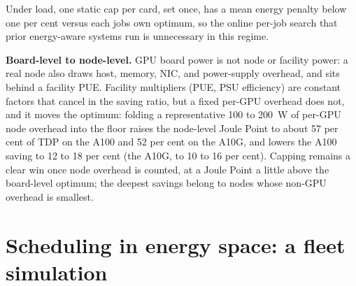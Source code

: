 Under load, one static cap per card, set once, has a mean energy penalty below one per cent versus each job\textquotesingle s own optimum, so the online per-job search that prior energy-aware systems run is unnecessary in this regime.

\textbf{Board-level to node-level.} GPU board power is not node or facility power: a real node also draws host, memory, NIC, and power-supply overhead, and sits behind a facility PUE. Facility multipliers (PUE, PSU efficiency) are constant factors that cancel in the saving ratio, but a fixed per-GPU overhead does not, and it moves the optimum: folding a representative 100 to 200~W of per-GPU node overhead into the floor raises the node-level Joule Point to about 57 per cent of TDP on the A100 and 52 per cent on the A10G, and lowers the A100 saving to 12 to 18 per cent (the A10G, to 10 to 16 per cent). Capping remains a clear win once node overhead is counted, at a Joule Point a little above the board-level optimum; the deepest savings belong to nodes whose non-GPU overhead is smallest.

\section{Scheduling in energy space: a fleet simulation}\label{scheduling-in-energy-space-a-fleet-simulation}

